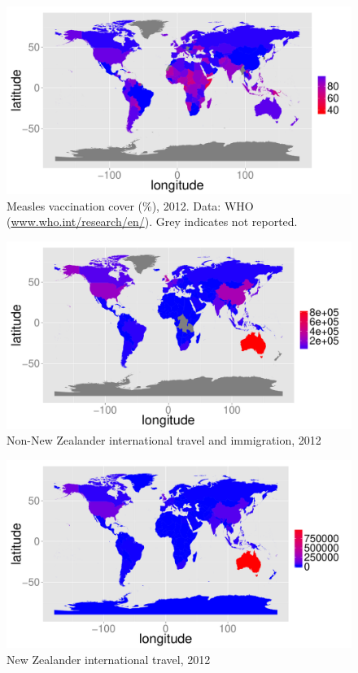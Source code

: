 \documentclass{article}
\begin{document}
\begin{figure}
\begin{center}
\includegraphics{draftfinalreport-038}
\end{center}
\caption{Measles vaccination cover (\%), 2012. Data: WHO (\href{http://www.who.int/research/en/}{www.who.int/research/en/}). Grey indicates not reported.}
\label{fig:cover12}
\end{figure}


\begin{figure}
\begin{center}
\includegraphics{draftfinalreport-039}
\end{center}
\caption{Non-New Zealander international travel and immigration, 2012 }
\label{fig:immigration12}
\end{figure}

\begin{figure}
\begin{center}
\includegraphics{draftfinalreport-040}
\end{center}
\caption{New Zealander international travel, 2012 }
\label{fig:nztravel12}
\end{figure}
\end{document}
